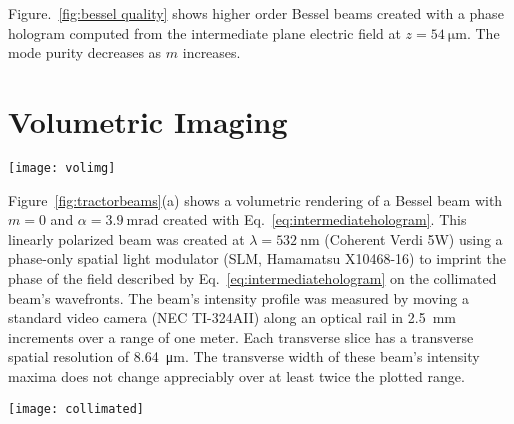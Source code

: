 Figure.~\ref{fig:bessel quality} shows higher order Bessel
beams created with a phase hologram computed from the 
intermediate plane electric field at $z=\SI{54}{\um}$.
The mode purity decreases as $m$ increases.


\section{Volumetric Imaging}

\begin{figure*}[!t]
  \centering
  \texttt{[image: volimg]}
  \caption{A schematic for volumetric imaging technique. We create volumetric representations of the intensity distribution of the electric field transformed by SLM by translating the camera on a meter length motorized train, acquiring a stack of two-dimensional images with \SI{1}{\mm} precision in the process. A linear phase ramp is added in the SLM phase to displace the diffracted beam in order to prevent any interference between the zeroth order residual beam and the desired optical field.}
  \label{fig:vol imaging schema}
\end{figure*}

Figure~\ref{fig:tractorbeams}(a) shows a volumetric
rendering of a Bessel beam with $m = 0$ and
$\alpha = \SI{3.9}{\milli\radian}$ created with
Eq.~\eqref{eq:intermediatehologram}.
This linearly polarized beam was created at $\lambda = \SI{532}{\nm}$
(Coherent Verdi 5W)
using a phase-only spatial light modulator (SLM, Hamamatsu X10468-16)
to imprint the phase of the field described by
Eq.~\eqref{eq:intermediatehologram}
on the collimated beam's wavefronts.
The beam's intensity profile was measured by
moving a standard
video camera (NEC TI-324AII) along an optical rail in \SI{2.5}{\mm}
increments over a range of one meter.
Each transverse slice has a transverse spatial resolution of \SI{8.64}{\um}.
The transverse width of these beam's intensity maxima does not change
appreciably over at least twice the plotted range.


\begin{figure*}[!t]
  \centering
  \texttt{[image: collimated]}
  \caption{Propagation-invariant modes projected with intermediate-plane
    holograms.  (a) Bessel beam, $m = 0$, $\alpha = \SI{3.9}{\milli\radian}$.
    (b) Optical conveyor,
    $m = 0$,
    $\alpha_1 = \SI{3.9}{\milli\radian}$,
    $\alpha_2 = \SI{8.8}{\milli\radian}$.
    (c) Solenoidal tractor beam,
    $m_1 = \num{-10}$,
    $m_2 = \num{-7}$,
    $\alpha_1 = \SI{6.4}{\milli\radian}$,
    $\alpha_2 = \SI{8.8}{\milli\radian}$.}
  \label{fig:tractorbeams}
\end{figure*}


